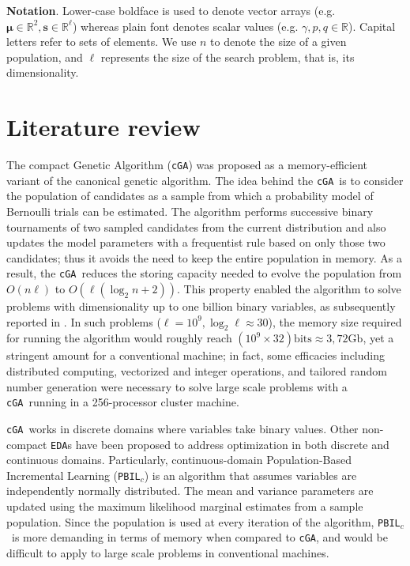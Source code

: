 \documentclass{sig-alternate}
\newcommand{\bs}{{\mathbf s}}
\newcommand{\PBILc}{\texttt{PBIL$_c$}}
\newcommand{\cGA}{\texttt{cGA}}
\newcommand{\EDA}{\texttt{EDA}}
\newcommand{\Rdom}{\mbox{$\mathbb{R}$}}
\begin{document}
\textbf{Notation}. Lower-case boldface is used to denote vector arrays (e.g. ${\boldsymbol \mu} \in \Rdom^2, \bs \in \Rdom^\ell$) whereas plain font denotes scalar values (e.g. $\gamma, p, q \in \Rdom$). Capital letters refer to sets of elements. We use $n$ to denote the size of a given population, and $\ell$ represents the size of the search problem, that is, its dimensionality. 

\section{Literature review}
\label{sec:review}
The compact Genetic Algorithm (\cGA)\cite{Harik99} was proposed as a memory-efficient variant of the canonical genetic algorithm\cite{Goldberg89}. The idea behind the \cGA~is to consider the population of candidates as a sample from which a probability model of Bernoulli trials can be estimated. The algorithm performs successive binary tournaments of two sampled candidates from the current distribution and also updates the model parameters with a frequentist rule based on only those two candidates; thus it avoids the need to keep the entire population in memory. As a result, the \cGA~reduces the storing capacity needed to evolve the population from $O(n\ell)$ to $O(\ell(\log_2 n+2))$. This property enabled the algorithm to solve problems with dimensionality up to one billion binary variables, as subsequently reported in \cite{Sastry07}. In such problems ($\ell=10^9, \log_2 \ell \approx 30$), the memory size required for running the algorithm would roughly reach $(10^9 \times 32)\mathrm{bits} \approx 3,72\mathrm{Gb}$, yet a stringent amount for a conventional machine; in fact, some efficacies including distributed computing, vectorized and integer operations, and tailored random number generation were necessary to solve large scale problems with a \cGA~running in a 256-processor cluster machine\cite{Sastry07}.  

\cGA~works in discrete domains where variables take binary values. Other non-compact \EDA s have been proposed to address optimization in both discrete\cite{Baluja95, Muhlenbein97} and continuous domains\cite{Sebag98, Larranaga02}. Particularly, continuous-domain Population-Based Incremental Learning (\PBILc) \cite{Sebag98} is an algorithm that assumes variables are independently normally distributed. The mean and variance parameters are updated using the maximum likelihood marginal estimates from a sample population. Since the population is used at every iteration of the algorithm, \PBILc~is more demanding in terms of memory when compared to \cGA, and would be difficult to apply to large scale problems in conventional machines.
\end{document}
